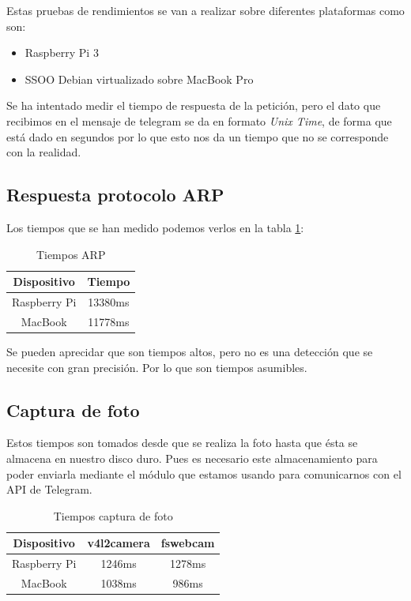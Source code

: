 \documentclass[10pt,journal,compsoc]{IEEEtran}
\begin{document}
Estas pruebas de rendimientos se van a realizar sobre diferentes 
plataformas como son:
\begin{itemize}
\item Raspberry Pi 3
\item SSOO Debian virtualizado sobre MacBook Pro
\end{itemize}

Se ha intentado medir el tiempo de respuesta de la petición, 
pero el dato que recibimos en el mensaje de telegram se da en 
formato \textit{Unix Time}, de forma que está dado en segundos 
por lo que esto nos da un tiempo que no se corresponde con la realidad.

\subsection{Respuesta protocolo ARP}
Los tiempos que se han medido podemos verlos en la tabla \ref{tab:tiemposARP}:

\begin{table}[h]
\centering
\begin{tabular}{cc}
 Dispositivo & Tiempo \\ \hline
Raspberry Pi & 13380ms \\
MacBook & 11778ms
\end{tabular} 
\caption{Tiempos ARP}
\label{tab:tiemposARP}
\end{table}

Se pueden aprecidar que son tiempos altos, pero no es una detección que se 
necesite con gran precisión. Por lo que son tiempos asumibles.

\subsection{Captura de foto}

Estos tiempos son tomados desde que se realiza la foto hasta que ésta se 
almacena en nuestro disco duro. Pues es necesario este almacenamiento para poder 
enviarla mediante el módulo que estamos usando para comunicarnos con el API de 
Telegram.

\begin{table}[h]
\centering
\begin{tabular}{ccc}
Dispositivo & v4l2camera & fswebcam \\ \hline
Raspberry Pi & 1246ms &  1278ms\\
MacBook &  1038ms & 986ms
\end{tabular} 
\caption{Tiempos captura de foto}
\label{tab:tiemposFoto}
\end{table}
\end{document}
